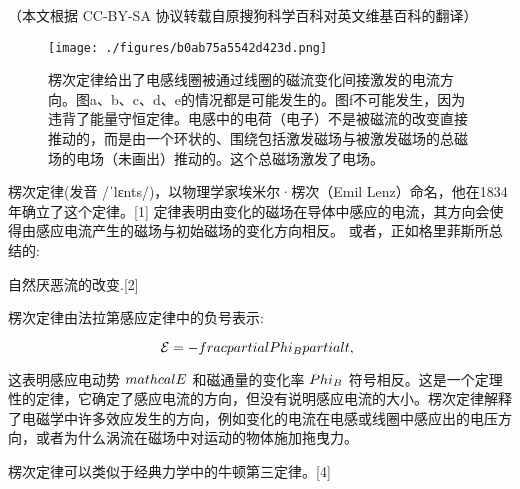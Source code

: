 
（本文根据 CC-BY-SA 协议转载自原搜狗科学百科对英文维基百科的翻译）

\begin{figure}[ht]
\centering
\texttt{[image: ./figures/b0ab75a5542d423d.png]}
\caption{楞次定律给出了电感线圈被通过线圈的磁流变化间接激发的电流方向。图a、b、c、d、e的情况都是可能发生的。图f不可能发生，因为违背了能量守恒定律。电感中的电荷（电子）不是被磁流的改变直接推动的，而是由一个环状的、围绕包括激发磁场与被激发磁场的总磁场的电场（未画出）推动的。这个总磁场激发了电场。} \label{fig_LCDL_1}
\end{figure}

楞次定律(发音 /ˈlɛnts/)，以物理学家埃米尔·楞次（Emil Lenz）命名，他在1834年确立了这个定律。[1] 定律表明由变化的磁场在导体中感应的电流，其方向会使得由感应电流产生的磁场与初始磁场的变化方向相反。 或者，正如格里菲斯所总结的:

自然厌恶流的改变.[2]

楞次定律由法拉第感应定律中的负号表示:

\begin{equation}
\mathcal{E} = -\\frac{\\partial \\Phi_B}{\\partial t},~
\end{equation}

这表明感应电动势 $\\mathcal{E}$ 和磁通量的变化率 $\\Phi_B$ 符号相反。这是一个定理性的定律，它确定了感应电流的方向，但没有说明感应电流的大小。楞次定律解释了电磁学中许多效应发生的方向，例如变化的电流在电感或线圈中感应出的电压方向，或者为什么涡流在磁场中对运动的物体施加拖曳力。

楞次定律可以类似于经典力学中的牛顿第三定律。[4]